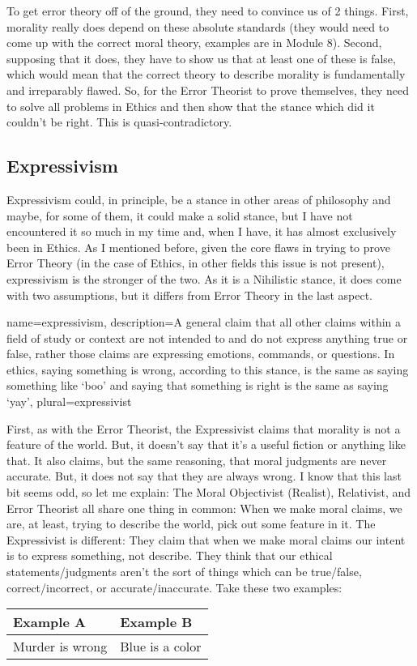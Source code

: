 To get error theory off of the ground, they need to convince us of 2 things. First, morality really does depend on these absolute standards (they would need to come up with the correct moral theory, examples are in Module 8). Second, supposing that it does, they have to show us that at least one of these is false, which would mean that the correct theory to describe morality is fundamentally and irreparably flawed. So, for the Error Theorist to prove themselves, they need to solve all problems in Ethics and then show that the stance which did it couldn't be right. This is quasi-contradictory.

\subsection{Expressivism}

Expressivism could, in principle, be a stance in other areas of philosophy and maybe, for some of them, it could make a solid stance, but I have not encountered it so much in my time and, when I have, it has almost exclusively been in Ethics. As I mentioned before, given the core flaws in trying to prove Error Theory (in the case of Ethics, in other fields this issue is not present), 
\Gls{expressivism} is the stronger of the two. As it is a Nihilistic stance, it does come with two assumptions, but it differs from Error Theory in the last aspect.

{
  name=expressivism,
  description={A general claim that all other claims within a field of study or context are not intended to and do not express anything true or false, rather those claims are expressing emotions, commands, or questions. In ethics, saying something is wrong, according to this stance, is the same as saying something like `boo' and saying that something is right is the same as saying `yay'},
plural=expressivist
}


First, as with the Error Theorist, the Expressivist claims that morality is not a feature of the world. But, it doesn't say that it's a useful fiction or anything like that. It also claims, but the same reasoning, that moral judgments are never accurate. But, it does not say that they are always wrong. I know that this last bit seems odd, so let me explain: The Moral Objectivist (Realist), Relativist, and Error Theorist all share one thing in common: When we make moral claims, we are, at least, trying to describe the world, pick out some feature in it. The Expressivist is different: They claim that when we make moral claims our intent is to express something, not describe. They think that our ethical statements/judgments aren't the sort of things which can be true/false, correct/incorrect, or accurate/inaccurate. Take these two examples: 
\noindent
\begin{tabular}{p{2.75in}|p{2.75in}}
Example A&Example B\\\hline
    Murder is wrong&Blue is a color
\end{tabular}

